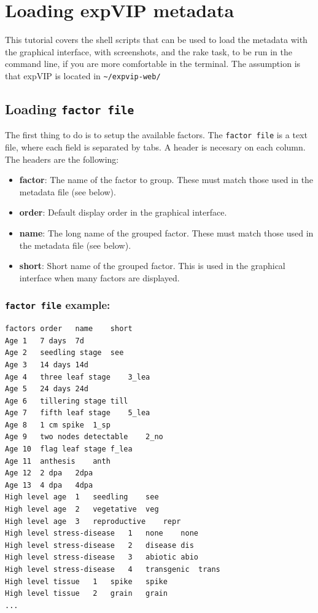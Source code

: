 
\section{Loading expVIP metadata}\label{loading-expvip-metadata}

This tutorial covers the shell scripts that can be used to load the
metadata with the graphical interface, with screenshots, and the rake
task, to be run in the command line, if you are more comfortable in the
terminal. The assumption is that expVIP is located in
\lstinline!~/expvip-web/!

\subsection{Loading \texttt{factor file}}\label{loading-factor-file}

The first thing to do is to setup the available factors. The
\lstinline!factor file! is a text file, where each field is separated by
tabs. A header is necesary on each column. The headers are the
following:

\begin{itemize}
\itemsep1pt\parskip0pt
\item
  \textbf{factor}: The name of the factor to group. These must match
  those used in the metadata file (see below).
\item
  \textbf{order}: Default display order in the graphical interface.
\item
  \textbf{name}: The long name of the grouped factor. These must match
  those used in the metadata file (see below).
\item
  \textbf{short}: Short name of the grouped factor. This is used in the
  graphical interface when many factors are displayed.
\end{itemize}

\subsubsection{\texttt{factor file}
example:}\label{factor-file-example}

\begin{lstlisting}
factors order   name    short
Age 1   7 days  7d
Age 2   seedling stage  see
Age 3   14 days 14d
Age 4   three leaf stage    3_lea
Age 5   24 days 24d
Age 6   tillering stage till
Age 7   fifth leaf stage    5_lea
Age 8   1 cm spike  1_sp
Age 9   two nodes detectable    2_no
Age 10  flag leaf stage f_lea
Age 11  anthesis    anth
Age 12  2 dpa   2dpa
Age 13  4 dpa   4dpa
High level age  1   seedling    see
High level age  2   vegetative  veg
High level age  3   reproductive    repr
High level stress-disease   1   none    none
High level stress-disease   2   disease dis
High level stress-disease   3   abiotic abio
High level stress-disease   4   transgenic  trans
High level tissue   1   spike   spike
High level tissue   2   grain   grain
...
\end{lstlisting}

